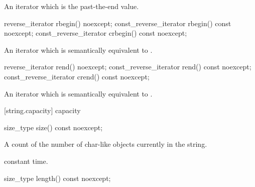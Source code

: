 \begin{itemdescr}
\pnum
\returns
An iterator which is the past-the-end value.
\end{itemdescr}

%
%
%
%
\begin{itemdecl}
reverse_iterator       rbegin() noexcept;
const_reverse_iterator rbegin() const noexcept;
const_reverse_iterator crbegin() const noexcept;
\end{itemdecl}

\begin{itemdescr}
\pnum
\returns
An iterator which is semantically equivalent to
.
\end{itemdescr}

%
%
%
%
\begin{itemdecl}
reverse_iterator       rend() noexcept;
const_reverse_iterator rend() const noexcept;
const_reverse_iterator crend() const noexcept;
\end{itemdecl}

\begin{itemdescr}
\pnum
\returns
An iterator which is semantically equivalent to
.
\end{itemdescr}

[string.capacity]{ capacity}

%
%
\begin{itemdecl}
size_type size() const noexcept;
\end{itemdecl}

\begin{itemdescr}
\pnum
\returns
A count of the number of char-like objects currently in the string.

\pnum
\complexity constant time.
\end{itemdescr}

%
%
\begin{itemdecl}
size_type length() const noexcept;
\end{itemdecl}

